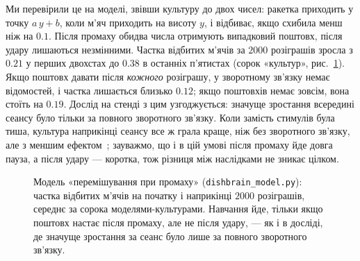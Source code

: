 Ми перевірили це на моделі, звівши культуру до двох чисел: ракетка приходить у точку $a\,y+b$, коли м'яч приходить на висоту $y$, і відбиває, якщо схибила менш ніж на $0.1$. Після промаху обидва числа отримують випадковий поштовх, після удару лишаються незмінними. Частка відбитих м'ячів за $2000$ розіграшів зросла з $0.21$ у перших двохстах до $0.38$ в останніх п'ятистах (сорок «культур», рис.~\ref{fig:dishmodel}). Якщо поштовх давати після \emph{кожного} розіграшу, у зворотному зв'язку немає відомостей, і частка лишається близько $0.12$; якщо поштовхів немає зовсім, вона стоїть на $0.19$. Дослід на стенді з цим узгоджується: значуще зростання всередині сеансу було тільки за повного зворотного зв'язку. Коли замість стимулів була тиша, культура наприкінці сеансу все ж грала краще, ніж без зворотного зв'язку, але з меншим ефектом~\cite{Kagan2022}; зауважмо, що і в цій умові після промаху йде довга пауза, а після удару --- коротка, тож різниця між наслідками не зникає цілком.

\begin{figure}[t]
\centering
{}
\caption{Модель «перемішування при промаху» (\texttt{dishbrain\_model.py}): частка відбитих м'ячів на початку і наприкінці $2000$ розіграшів, середнє за сорока моделями-культурами. Навчання йде, тільки якщо поштовх настає після промаху, але не після удару, --- як і в досліді, де значуще зростання за сеанс було лише за повного зворотного зв'язку.}
\label{fig:dishmodel}
\end{figure}

